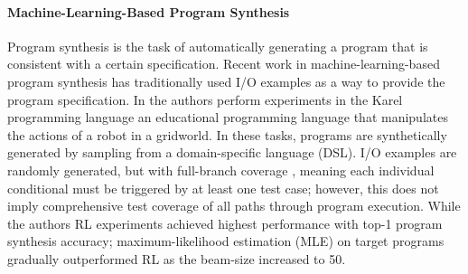 \documentclass{article}
\begin{document}





\paragraph{Machine-Learning-Based Program Synthesis} Program synthesis is the task of automatically generating a program that is consistent with a certain specification. Recent work in machine-learning-based program synthesis has traditionally used I/O examples as a way to provide the program specification. In \cite{bunel2018leveraging} the authors perform experiments in the Karel programming language \cite{pattis1981karel} an educational programming language that manipulates the actions of a robot in a gridworld.
In these tasks, programs are synthetically generated by sampling from a domain-specific language (DSL). I/O examples are randomly generated, but with full-branch coverage , meaning each individual conditional must be triggered by at least one  test case; however, this does not imply comprehensive test coverage of all paths through program execution. While the authors RL experiments achieved highest performance with top-1 program synthesis accuracy; maximum-likelihood estimation (MLE) on target programs gradually outperformed RL as the beam-size increased to 50. 
\end{document}
